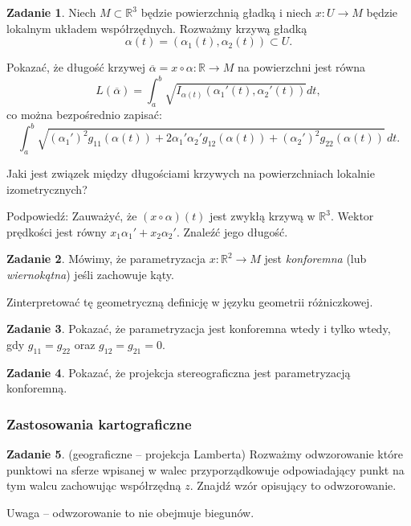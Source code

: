 \documentclass[a4paper,11pt]{article}
\theoremstyle{definition}\newtheorem{exercise}{Zadanie}
\theoremstyle{definition}\newtheorem{remark}{Uwaga}
\begin{document}
\begin{exercise}
Niech $M\subset \mathbb{R}^3$ będzie powierzchnią gładką i niech $x\colon U\to 
M$ będzie lokalnym układem współrzędnych. Rozważmy krzywą gładką 
\[\alpha(t)=\left(\alpha_1(t),\alpha_2(t)\right)\subset U.\]

Pokazać, że długość krzywej $\overline{\alpha}=x\circ\alpha\colon \mathbb{R}\to 
M$ na powierzchni jest równa
\[L(\overline{\alpha})=\int_a^b\sqrt{I_{\alpha(t)}\left(\alpha_1 '(t),\alpha_2 
'(t)\right)}dt,\]
co można bezpośrednio zapisać:
\[\int_a^b\sqrt{\left(\alpha_1'\right)^2 g_{11}(\alpha(t))+ 2 
\alpha_1'\alpha_2'g_{12}(\alpha(t))+\left(\alpha_2'\right)^2 
g_{22}(\alpha(t))}\,dt.\]

Jaki jest związek między długościami krzywych na powierzchniach lokalnie 
izometrycznych?

\small {Podpowiedź: Zauważyć, że $(x\circ \alpha )(t)$ jest zwykłą krzywą w 
$\mathbb{R}^3$. Wektor prędkości jest r\'owny $x_1\alpha_1' +x_2\alpha_2'$. 
Znaleźć jego długość.}
\end{exercise} 
 

\begin{exercise}
 M\'owimy, że parametryzacja $x\colon \mathbb{R}^2\to M$ jest 
\textit{konforemna} (lub \textit{wiernokątna}) jeśli zachowuje kąty.

Zinterpretować tę geometryczną definicję w języku geometrii r\'ożniczkowej.
\end{exercise}
 
\begin{exercise}
 Pokazać, że parametryzacja jest konforemna wtedy i tylko wtedy, gdy $g_{11} 
=g_{22} $ oraz $g_{12} =g_{21} =0$.
\end{exercise}

\begin{exercise}
 Pokazać, że projekcja stereograficzna jest parametryzacją konforemną.
\end{exercise}

\subsubsection{Zastosowania kartograficzne}

\begin{exercise}(geograficzne -- projekcja Lamberta)
Rozważmy odwzorowanie kt\'ore punktowi na sferze wpisanej w walec 
przyporządkowuje odpowiadający punkt na tym walcu zachowując wsp\'ołrzędną $z$. 
Znajdź wz\'or opisujący to odwzorowanie.

\small{Uwaga -- odwzorowanie to nie obejmuje biegun\'ow.}
\end{exercise}
\end{document}
